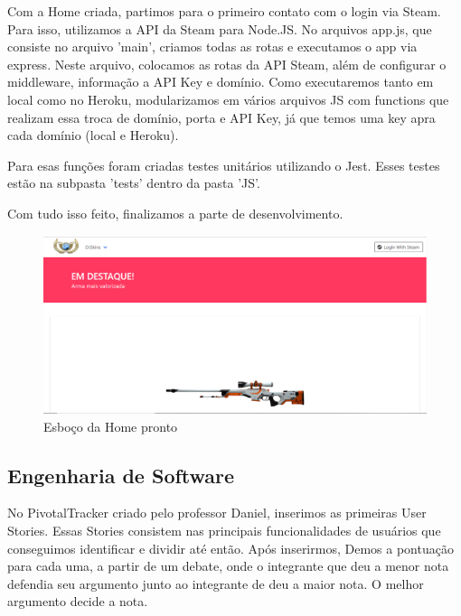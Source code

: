 \documentclass[a4paper,12pt]{article}
\begin{document}
    Com a Home criada, partimos para o primeiro contato com o login via Steam. Para isso, utilizamos a API
    da Steam para Node.JS. No arquivos app.js, que consiste no arquivo 'main', criamos todas as rotas
    e executamos o app via express. Neste arquivo, colocamos as rotas da API Steam, além de configurar
    o middleware, informação a API Key e domínio. Como executaremos tanto em local como no Heroku, modularizamos
    em vários arquivos JS com functions que realizam essa troca de domínio, porta e API Key, já que temos
    uma key apra cada domínio (local e Heroku). 

    Para esas funções foram criadas testes unitários utilizando o Jest. Esses testes estão na subpasta 'tests' 
    dentro da pasta 'JS'.

    Com tudo isso feito, finalizamos a parte de desenvolvimento.\\
    \begin{figure}[!htb]
        \centering
        \includegraphics[scale=0.5]{Imagens/Home.png}
        \caption{Esboço da Home pronto}
    \end{figure}

    \subsection{Engenharia de Software}
    No PivotalTracker criado pelo professor Daniel, inserimos as primeiras User Stories. Essas Stories consistem 
    nas principais funcionalidades de usuários que conseguimos identificar e dividir até então. Após inserirmos, 
    Demos a pontuação para cada uma, a partir de um debate, onde o integrante que deu a menor nota defendia seu argumento 
    junto ao integrante de deu a maior nota. O melhor argumento decide a nota.
\end{document}
